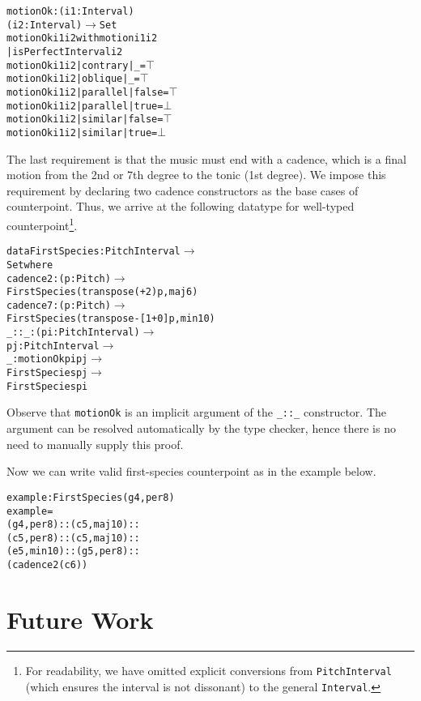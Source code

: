 \documentclass[sigplan,10pt,screen]{acmart}
\begin{document}
\begin{alltt}
motionOk : (i1 : Interval)
           (i2 : Interval) \(\rightarrow\) Set
motionOk i1 i2 with motion i1 i2
         | isPerfectInterval i2
motionOk i1 i2 | contrary | \_     = \(\top\)
motionOk i1 i2 | oblique  | \_     = \(\top\)
motionOk i1 i2 | parallel | false = \(\top\)
motionOk i1 i2 | parallel | true  = \(\bot\)
motionOk i1 i2 | similar  | false = \(\top\)
motionOk i1 i2 | similar  | true  = \(\bot\)
\end{alltt}

The last requirement is that the music must end with a cadence,
which is a final motion from the 2nd or 7th degree to the tonic 
(1st degree). 
We impose this requirement by declaring two cadence constructors 
as the base cases of counterpoint.
Thus, we arrive at the following datatype for well-typed counterpoint\footnote{
For readability, we have omitted explicit conversions 
from \texttt{PitchInterval} (which ensures the interval is not dissonant) 
to the general \texttt{Interval}.}.

\begin{alltt}
data FirstSpecies : PitchInterval \(\rightarrow\)
                    Set where
  cadence2 : (p : Pitch) \(\rightarrow\)
    FirstSpecies (transpose (+ 2) p , maj6)
  cadence7 : (p : Pitch) \(\rightarrow\)
    FirstSpecies (transpose -[1+ 0 ] p , min10)
  \_::\_ : (pi : PitchInterval) \(\rightarrow\)
         {pj : PitchInterval} \(\rightarrow\)
         {\_ : motionOk pi pj} \(\rightarrow\)
         FirstSpecies pj \(\rightarrow\)
         FirstSpecies pi
\end{alltt}

\noindent Observe that \texttt{motionOk} is an implicit argument of 
the \texttt{\_::\_} constructor. 
The argument can be resolved automatically by the type checker,
hence there is no need to manually supply this proof. 

Now we can write valid first-species counterpoint as in the 
example below.

\begin{alltt}
example : FirstSpecies (g 4 , per8)
example = 
  (g 4 , per8) :: (c 5 , maj10) ::
  (c 5 , per8) :: (c 5 , maj10) ::
  (e 5 , min10) :: (g 5 , per8) ::
  (cadence2 (c 6))
\end{alltt}


\section{Future Work}
\end{document}
